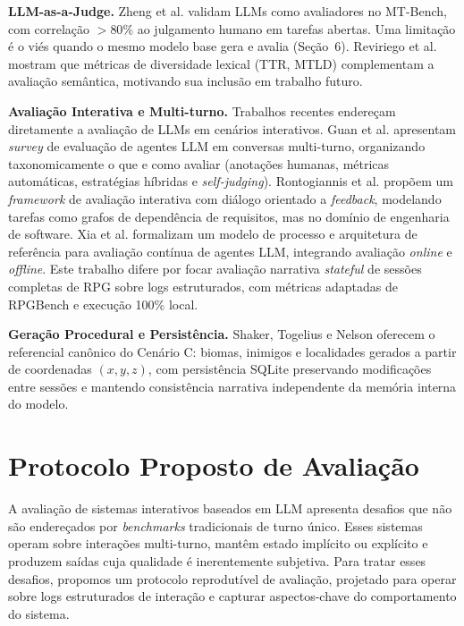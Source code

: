 \documentclass[12pt]{article}
\begin{document}
\textbf{LLM-as-a-Judge.}
Zheng et al. \cite{zheng:2023} validam LLMs como avaliadores no MT-Bench, com correlação $>80\%$ ao julgamento humano em tarefas abertas. Uma limitação é o viés quando o mesmo modelo base gera e avalia (Seção~6). Reviriego et al. \cite{reviriego:2024} mostram que métricas de diversidade lexical (TTR, MTLD) complementam a avaliação semântica, motivando sua inclusão em trabalho futuro.

\textbf{Avaliação Interativa e Multi-turno.}
Trabalhos recentes endereçam diretamente a avaliação de LLMs em cenários interativos. Guan et al. \cite{guan:2025} apresentam \textit{survey} de evaluação de agentes LLM em conversas multi-turno, organizando taxonomicamente o que e como avaliar (anota\c{c}\~oes humanas, m\'etricas autom\'aticas, estrat\'egias h\'ibridas e \textit{self-judging}). Rontogiannis et al. \cite{rontogiannis:2025} propõem um \textit{framework} de avaliação interativa com diálogo orientado a \textit{feedback}, modelando tarefas como grafos de dependência de requisitos, mas no domínio de engenharia de software. Xia et al. \cite{xia:2024} formalizam um modelo de processo e arquitetura de referência para avaliação contínua de agentes LLM, integrando avaliação \textit{online} e \textit{offline}. Este trabalho difere por focar avaliação narrativa \textit{stateful} de sessões completas de RPG sobre logs estruturados, com métricas adaptadas de RPGBench e execução 100\% local.

\textbf{Geração Procedural e Persistência.}
Shaker, Togelius e Nelson \cite{shaker:2016} oferecem o referencial canônico do Cenário C: biomas, inimigos e localidades gerados a partir de coordenadas $(x,y,z)$, com persistência SQLite preservando modificações entre sessões e mantendo consistência narrativa independente da memória interna do modelo.

\section{Protocolo Proposto de Avaliação}
\label{sec:protocolo}

A avaliação de sistemas interativos baseados em LLM apresenta desafios que não são endereçados por \textit{benchmarks} tradicionais de turno único. Esses sistemas operam sobre interações multi-turno, mantêm estado implícito ou explícito e produzem saídas cuja qualidade é inerentemente subjetiva. Para tratar esses desafios, propomos um protocolo reprodutível de avaliação, projetado para operar sobre logs estruturados de interação e capturar aspectos-chave do comportamento do sistema.
\end{document}
